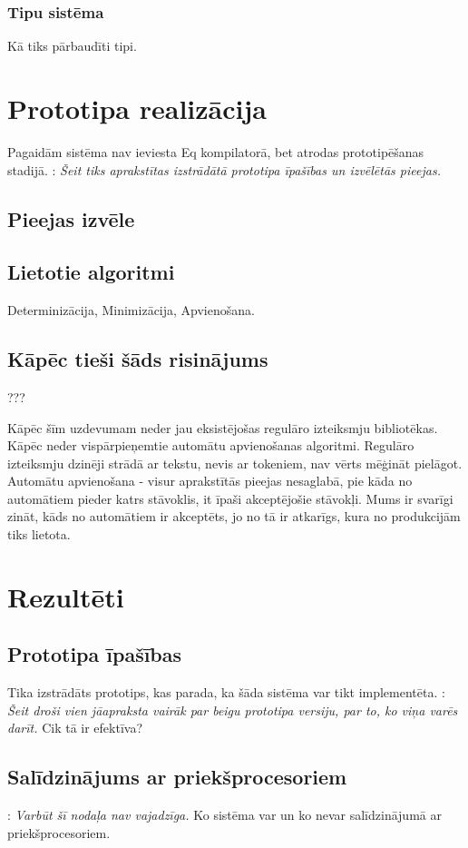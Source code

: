 \documentclass[12pt]{report}
\newcommand{\fixme}[1]{\vskip 5mm\noindent{\bf FIXME}: {\it #1}}
\begin{document}
\subsubsection{Tipu sistēma}
Kā tiks pārbaudīti tipi.
\section{Prototipa realizācija}
Pagaidām sistēma nav ieviesta Eq kompilatorā, bet atrodas prototipēšanas stadijā. \fixme{Šeit tiks aprakstītas izstrādātā prototipa īpašības un izvēlētās pieejas.}
\subsection{Pieejas izvēle}

\subsection{Lietotie algoritmi}
Determinizācija,
Minimizācija,
Apvienošana.

\subsection{Kāpēc tieši šāds risinājums}
???

Kāpēc šīm uzdevumam neder jau eksistējošas regulāro izteiksmju bibliotēkas. Kāpēc  neder vispārpieņemtie automātu apvienošanas algoritmi.
Regulāro izteiksmju dzinēji strādā ar tekstu, nevis ar tokeniem, nav vērts mēģināt pielāgot. Automātu apvienošana - visur aprakstītās pieejas nesaglabā, pie kāda no automātiem pieder katrs stāvoklis, it īpaši akceptējošie stāvokļi. Mums ir svarīgi zināt, kāds no automātiem ir akceptēts, jo no tā ir atkarīgs, kura no produkcijām tiks lietota. 

\section{Rezultēti}

\subsection{Prototipa īpašības}
Tika izstrādāts prototips, kas parada, ka šāda sistēma var tikt implementēta.
\fixme{Šeit droši vien jāapraksta vairāk par beigu prototipa versiju, par to, ko viņa varēs darīt.} Cik tā ir efektīva?
\subsection{Salīdzinājums ar priekšprocesoriem}
\fixme{Varbūt šī nodaļa nav vajadzīga.}
Ko sistēma var un ko nevar salīdzinājumā ar priekšprocesoriem.
\end{document}
